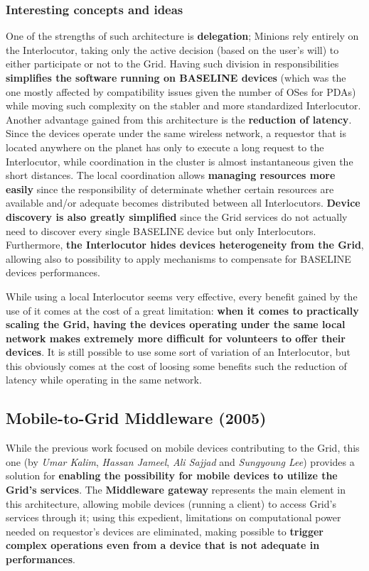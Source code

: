 \subsubsection{Interesting concepts and ideas}
One of the strengths of such architecture is \textbf{delegation}; Minions rely entirely on the Interlocutor, taking only the active decision (based on the user's will) to either participate or not to the Grid. Having such division in responsibilities \textbf{simplifies the software running on BASELINE devices} (which was the one mostly affected by compatibility issues given the number of OSes for PDAs) while moving such complexity on the stabler and more standardized Interlocutor.
Another advantage gained from this architecture is the \textbf{reduction of latency}. Since the devices operate under the same wireless network, a requestor that is located anywhere on the planet has only to execute a long request to the Interlocutor, while coordination in the cluster is almost instantaneous given the short distances.
The local coordination allows \textbf{managing resources more easily} since the responsibility of determinate whether certain resources are available and/or adequate becomes distributed between all Interlocutors.
\textbf{Device discovery is also greatly simplified} since the Grid services do not actually need to discover every single BASELINE device but only Interlocutors.
Furthermore, \textbf{the Interlocutor hides devices heterogeneity from the Grid}, allowing also to possibility to apply mechanisms to compensate for BASELINE devices performances.

While using a local Interlocutor seems very effective, every benefit gained by the use of it comes at the cost of a great limitation: \textbf{when it comes to practically scaling the Grid, having the devices operating under the same local network makes extremely more difficult for volunteers to offer their devices}. It is still possible to use some sort of variation of an Interlocutor, but this obviously comes at the cost of loosing some benefits such the reduction of latency while operating in the same network.

\subsection{Mobile-to-Grid Middleware (2005)}
While the previous work focused on mobile devices contributing to the Grid, this one (by \textit{Umar Kalim}, \textit{Hassan Jameel}, \textit{Ali Sajjad} and \textit{Sungyoung Lee}) provides a solution for \textbf{enabling the possibility for mobile devices to utilize the Grid's services}.
The \textbf{Middleware gateway} represents the main element in this architecture, allowing mobile devices (running a client) to access Grid's services through it; using this expedient, limitations on computational power needed on requestor's devices are eliminated, making possible to \textbf{trigger complex operations even from a device that is not adequate in performances}.

